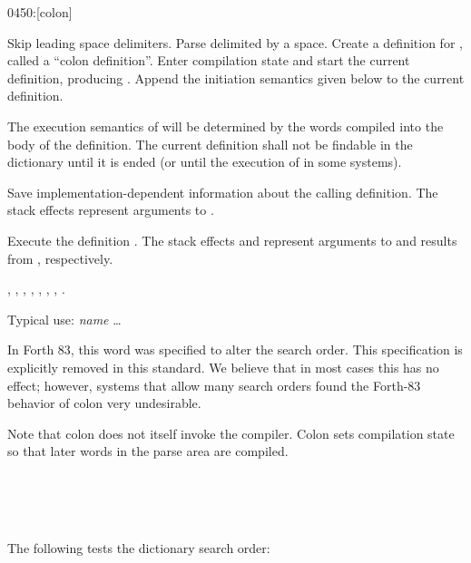 \begin{worddef}{0450}{:}[colon]
\item {}

	Skip leading space delimiters. Parse  delimited by a
	space. Create a definition for , called a ``colon
	definition''. Enter compilation state and start the current
	definition, producing . Append the initiation
	semantics given below to the current definition.

	The execution semantics of  will be determined by the
	words compiled into the body of the definition. The current
	definition shall not be findable in the dictionary until it is
	ended (or until the execution of  in some systems).

\init {}

	Save implementation-dependent information 
	about the calling definition. The stack effects 
	represent arguments to .

\execute[name]

	Execute the definition . The stack effects
	 and  represent arguments to and
	results from , respectively.

\see {},
	,
	,
	,
	\wref{core:[}{[},
	\wref{core:]}{]},
	,
	.

	\begin{rationale} %
		Typical use:
			\word{:} \emph{name} {\ldots} \word{;}

		In Forth 83, this word was specified to alter the search order.
		This specification is explicitly removed in this standard. We
		believe that in most cases this has no effect; however, systems
		that allow many search orders found the Forth-83 behavior of
		colon very undesirable.

		Note that colon does not itself invoke the compiler. Colon sets
		compilation state so that later words in the parse area are
		compiled.
	\end{rationale}

	\begin{testing} %
		 \\
		 \\
		 \\

		The following tests the dictionary search order:

		 \\
	\end{testing}
\end{worddef}


